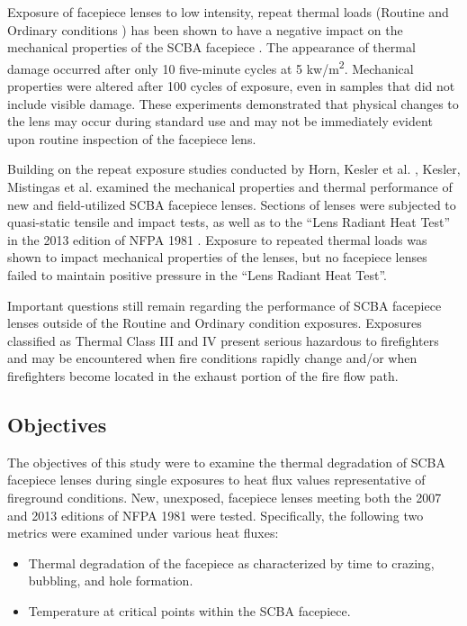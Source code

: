 \documentclass[sn-mathphys]{sn-jnl}%
\theoremstyle{thmstyleone}%
\theoremstyle{thmstyletwo}%
\theoremstyle{thmstylethree}%
\begin{document}
Exposure of facepiece lenses to low intensity, repeat thermal loads (Routine and Ordinary conditions \cite{madrzykowski_fire_2017}) has been shown to have a negative impact on the mechanical properties of the SCBA facepiece \cite{horn_study_2017}. The appearance of thermal damage occurred after only 10 five-minute cycles at 5 kw/m\textsuperscript{2}. Mechanical properties were altered after 100 cycles of exposure, even in samples that did not include visible damage.  These experiments demonstrated that physical changes to the lens may occur during standard use and may not be immediately evident upon routine inspection of the facepiece lens. 

Building on the repeat exposure studies conducted by Horn, Kesler et al. \cite{horn_study_2017}, Kesler, Mistingas et al. \cite{kesler_mechanical_2018} examined the mechanical properties and thermal performance of new and field-utilized SCBA facepiece lenses. Sections of lenses were subjected to quasi-static tensile and impact tests, as well as to the “Lens Radiant Heat Test” in the 2013 edition of NFPA 1981 \cite{national_fire_protection_association_nfpa_2013}. Exposure to repeated thermal loads was shown to impact mechanical properties of the lenses, but no facepiece lenses failed to maintain positive pressure in the “Lens Radiant Heat Test”.  

Important questions still remain regarding the performance of SCBA facepiece lenses outside of the Routine and Ordinary condition exposures. Exposures classified as Thermal Class III and IV present serious hazardous to firefighters and may be encountered when fire conditions rapidly change and/or when firefighters become located in the exhaust portion of the fire flow path.

\subsection{Objectives}
The objectives of this study were to examine the thermal degradation of SCBA facepiece lenses during single exposures to heat flux values representative of fireground conditions. New, unexposed, facepiece lenses meeting both the 2007 and 2013 editions of NFPA 1981 were tested. Specifically, the following two metrics were examined under various heat fluxes:

\begin{itemize}
    \item{Thermal degradation of the facepiece as characterized by time to crazing, bubbling, and hole formation.}
    \item{Temperature at critical points within the SCBA facepiece.}
\end{itemize}
\end{document}
